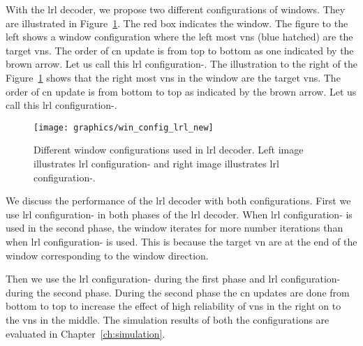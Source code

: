 With the \ac{lrl} decoder, we propose two different configurations of windows. They are illustrated in Figure~\ref{fig:win_config_lrl}. The red box indicates the window. The figure to the left shows a window configuration where the left most \acp{vn} (blue hatched) are the target \acp{vn}. The order of \ac{cn} update is from top to bottom as one indicated by the brown arrow. Let us call this \ac{lrl} configuration-. The illustration to the right of the Figure~\ref{fig:win_config_lrl} shows that the right most \acp{vn} in the window are the target \acp{vn}. The order of \ac{cn} update is from bottom to top as indicated by the brown arrow. Let us call this \ac{lrl} configuration-.

\begin{figure}[htbp]
  \centering
  \texttt{[image: graphics/win\_config\_lrl\_new]}
  \caption{Different window configurations used in \ac{lrl} decoder. Left image illustrates \ac{lrl} configuration- and right image illustrates \ac{lrl} configuration-.}
  \label{fig:win_config_lrl}
\end{figure}

We discuss the performance of the \ac{lrl} decoder with both configurations. First we use \ac{lrl} configuration- in both phases of the \ac{lrl} decoder. When \ac{lrl} configuration- is used in the second phase, the window iterates for more number iterations than when \ac{lrl} configuration- is used. This is because the target \ac{vn} are at the end of the window corresponding to the window direction.

Then we use the \ac{lrl} configuration- during the first phase and \ac{lrl} configuration- during the second phase. During the second phase the \ac{cn} updates are done from bottom to top to increase the effect of high reliability of \acp{vn} in the right on to the \acp{vn} in the middle. The simulation results of both the configurations are evaluated in Chapter~\ref{ch:simulation}.


